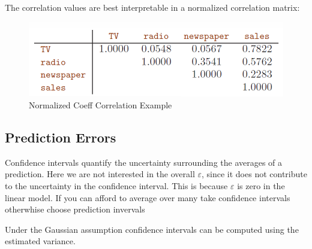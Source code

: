 \documentclass[../Main.tex]{subfiles}
\begin{document}
The correlation values are best interpretable in a normalized correlation matrix:
\begin{figure}[H]
    \centering
    \includegraphics[width=0.5\linewidth]{Images/corr-example.png}
    \caption{Normalized Coeff Correlation Example}
\end{figure}

\subsection{Prediction Errors}

Confidence intervals quantify the uncertainty surrounding the averages of a prediction.
Here we are not interested in the overall \(\varepsilon\), since it does not contribute to the uncertainty
in the confidence interval. This is because \(\varepsilon\) is zero in the linear model.
If you can afford to average over many take confidence intervals otherwhise choose prediction invervals


Under the Gaussian assumption confidence intervals can be computed using the estimated variance. 
\end{document}
